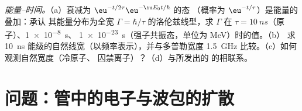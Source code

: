 \begin{exercise}[$\star\star\star$]\label{exo:b2:schrodinger-wave-functions:12}
\emph{能量–时间。}（a）衰减为 $\eu^{-t/2\tau}\eu^{-\iu E_0t/\hbar}$ 的态
（概率为 $\eu^{-t/\tau}$）是能量的叠加：承认
其能量分布为全宽 $\Gamma =
\hbar/\tau$ 的洛伦兹线型，求 $\Gamma$ 在 $\tau = \qty{10}{ns}$（原子）、\qty{1e-8}{s}、
\qty{1e-23}{s}（强子共振态，单位为 MeV）时的值。（b）
求 \qty{10}{ns} 能级的自然线宽（以频率表示），并与多普勒宽度
\qty{1.5}{GHz} 比较。（c）如何观测自然宽度（冷原子、
囚禁离子）？（d）与所发出的
的相联系。
\end{exercise}

\section{问题：管中的电子与波包的扩散}

